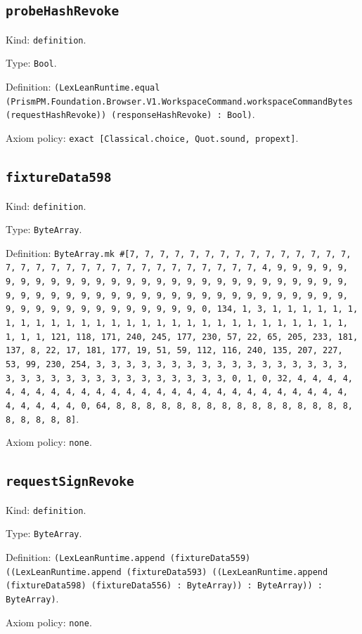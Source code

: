 \documentclass[11pt]{article}
\begin{document}
\subsection*{\texttt{probeHashRevoke}}
\noindent Kind: \texttt{definition}.\par
\noindent Type: \texttt{Bool}.\par
\noindent Definition: \texttt{(LexLeanRuntime.equal (PrismPM.Foundation.Browser.V1.WorkspaceCommand.workspaceCommandBytes (requestHashRevoke)) (responseHashRevoke) : Bool)}.\par
\noindent Axiom policy: \texttt{exact [Classical.choice, Quot.sound, propext]}.\par
\subsection*{\texttt{fixtureData598}}
\noindent Kind: \texttt{definition}.\par
\noindent Type: \texttt{ByteArray}.\par
\noindent Definition: \texttt{ByteArray.mk \#[7, 7, 7, 7, 7, 7, 7, 7, 7, 7, 7, 7, 7, 7, 7, 7, 7, 7, 7, 7, 7, 7, 7, 7, 7, 7, 7, 7, 7, 7, 7, 7, 4, 9, 9, 9, 9, 9, 9, 9, 9, 9, 9, 9, 9, 9, 9, 9, 9, 9, 9, 9, 9, 9, 9, 9, 9, 9, 9, 9, 9, 9, 9, 9, 9, 9, 9, 9, 9, 9, 9, 9, 9, 9, 9, 9, 9, 9, 9, 9, 9, 9, 9, 9, 9, 9, 9, 9, 9, 9, 9, 9, 9, 9, 9, 9, 9, 0, 134, 1, 3, 1, 1, 1, 1, 1, 1, 1, 1, 1, 1, 1, 1, 1, 1, 1, 1, 1, 1, 1, 1, 1, 1, 1, 1, 1, 1, 1, 1, 1, 1, 1, 1, 121, 118, 171, 240, 245, 177, 230, 57, 22, 65, 205, 233, 181, 137, 8, 22, 17, 181, 177, 19, 51, 59, 112, 116, 240, 135, 207, 227, 53, 99, 230, 254, 3, 3, 3, 3, 3, 3, 3, 3, 3, 3, 3, 3, 3, 3, 3, 3, 3, 3, 3, 3, 3, 3, 3, 3, 3, 3, 3, 3, 3, 3, 3, 3, 0, 1, 0, 32, 4, 4, 4, 4, 4, 4, 4, 4, 4, 4, 4, 4, 4, 4, 4, 4, 4, 4, 4, 4, 4, 4, 4, 4, 4, 4, 4, 4, 4, 4, 4, 4, 0, 64, 8, 8, 8, 8, 8, 8, 8, 8, 8, 8, 8, 8, 8, 8, 8, 8, 8, 8, 8, 8, 8]}.\par
\noindent Axiom policy: \texttt{none}.\par
\subsection*{\texttt{requestSignRevoke}}
\noindent Kind: \texttt{definition}.\par
\noindent Type: \texttt{ByteArray}.\par
\noindent Definition: \texttt{(LexLeanRuntime.append (fixtureData559) ((LexLeanRuntime.append (fixtureData593) ((LexLeanRuntime.append (fixtureData598) (fixtureData556) : ByteArray)) : ByteArray)) : ByteArray)}.\par
\noindent Axiom policy: \texttt{none}.\par
\end{document}
